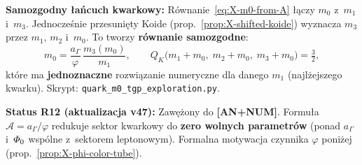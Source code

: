 \begin{theorem}[Uniwersalna sta\l{}a konfinementowa
  $\mathcal{A} = a_\Gamma / \varphi$]
\medskip\noindent
\textbf{Samozgodny \l{}a\'ncuch kwarkowy:}
R\'ownanie~\eqref{eq:X-m0-from-A} \l{}\k{a}czy $m_0$ z~$m_1$ i~$m_3$.
Jednocze\'snie przesuni\k{e}ty Koide
(prop.~\ref{prop:X-shifted-koide}) wyznacza $m_3$ przez $m_1$, $m_2$
i~$m_0$. To tworzy \textbf{r\'ownanie samozgodne}:
\begin{equation}\label{eq:X-self-consistent}
  m_0 = \frac{a_\Gamma}{\varphi}\,
  \frac{m_3(m_0)}{m_1},
  \qquad
  Q_K\bigl(m_1 + m_0,\; m_2 + m_0,\; m_3 + m_0\bigr) = \tfrac{3}{2},
\end{equation}
kt\'ore ma \textbf{jednoznaczne} rozwi\k{a}zanie numeryczne
dla danego $m_1$ (najl\.zejszego kwarku).
Skrypt: \texttt{quark\_m0\_tgp\_exploration.py}.

\medskip\noindent
\textbf{Status R12 (aktualizacja v47):}
Zawężony do \textbf{[AN+NUM]}. Formuła $\mathcal{A} = a_\Gamma/\varphi$
redukuje sektor kwarkowy do \textbf{zero wolnych parametr\'ow}
(ponad $a_\Gamma$ i~$\varPhi_0$ wsp\'olne z~sektorem
leptonowym). Formalna motywacja czynnika $\varphi$ poni\.zej
(prop.~\ref{prop:X-phi-color-tube}).
\end{theorem}

